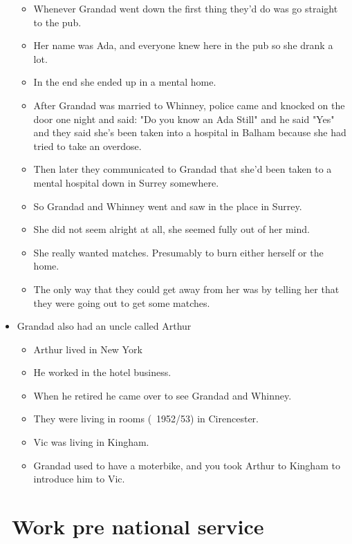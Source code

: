 \documentclass[10pt,twocolumn,letterpaper]{article}
\begin{document}
\begin{itemize}
\begin{itemize}
        \item Whenever Grandad went down the first thing they'd do was go straight to the pub.
        \item Her name was Ada, and everyone knew here in the pub so she drank a lot.
        \item In the end she ended up in a mental home.
        \item After Grandad was married to Whinney, police came and knocked on the door one night and said: "Do you know an Ada Still" and he said "Yes" and they said she's been taken into a hospital in Balham because she had tried to take an overdose.
        \item Then later they communicated to Grandad that she'd been taken to a mental hospital down in Surrey somewhere.
        \item So Grandad and Whinney went and saw in the place in Surrey.
        \item She did not seem alright at all, she seemed fully out of her mind.
        \item She really wanted matches. Presumably to burn either herself or the home.
        \item The only way that they could get away from her was by telling her that they were going out to get some matches.
    \end{itemize}
    \item Grandad also had an uncle called Arthur
    \begin{itemize}
        \item Arthur lived in New York
        \item He worked in the hotel business.
        \item When he retired he came over to see Grandad and Whinney.
        \item They were living in rooms (~1952/53) in Cirencester.
        \item Vic was living in Kingham.
        \item Grandad used to have a moterbike, and you took Arthur to Kingham to introduce him to Vic.
    \end{itemize}
\end{itemize}


\section{~Work pre national service}
\end{document}
